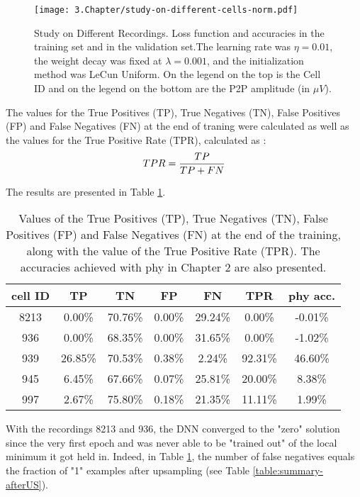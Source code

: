 \begin{figure}[htbp]
	\centering
	\texttt{[image: 3.Chapter/study-on-different-cells-norm.pdf]}
	\caption{Study on Different Recordings. Loss function and accuracies in the training set and in the validation set.The learning rate was $\eta = 0.01$, the weight decay was fixed at $\lambda = 0.001$, and the initialization method was LeCun Uniform. On the legend on the top is the Cell ID and on the legend on the bottom are the P2P amplitude (in $\mu V$).
}
\label{fig:study-cells}
\end{figure}

The values for the True Positives (TP), True Negatives (TN), False Positives (FP) and False Negatives (FN) at the end of traning were calculated as well as the values for the True Positive Rate (TPR), calculated as :
\begin{equation}
\centering
TPR = \frac{TP}{TP + FN}
\end{equation}

The results are presented in Table \ref{table:confusion-matrix}.

\begin{table}[htbp]
\begin{center}
\begin{tabular}{c|cccc|cc}
cell ID & TP & TN & FP & FN & TPR & phy acc.\\ \hline
8213 & 0.00\% & 70.76\% & 0.00\% & 29.24\% & 0.00\% & -0.01\% \\
936 & 0.00\% & 68.35\% & 0.00\% & 31.65\% & 0.00\% & -1.02\% \\ 
939 & 26.85\% & 70.53\% & 0.38\% & 2.24\% & 92.31\% & 46.60\% \\ 
945 & 6.45\% & 67.66\% & 0.07\% & 25.81\% & 20.00\% & 8.38\% \\ 
997 & 2.67\% & 75.80\% & 0.18\% & 21.35\% & 11.11\% & 1.99\% \\ 
\end{tabular}
\end{center}
\caption{Values of the True Positives (TP), True Negatives (TN), False Positives (FP) and False Negatives (FN) at the end of the training, along with the value of the True Positive Rate (TPR). The accuracies achieved with phy in Chapter 2 are also presented. }
\label{table:confusion-matrix}
\end{table}

With the recordings 8213 and 936, the DNN converged to the "zero" solution since the very first epoch and was never able to be "trained out" of the local minimum it got held in. Indeed, in Table \ref{table:confusion-matrix}, the number of false negatives equals the fraction of "1" examples after upsampling (see Table \ref{table:summary-afterUS}).

